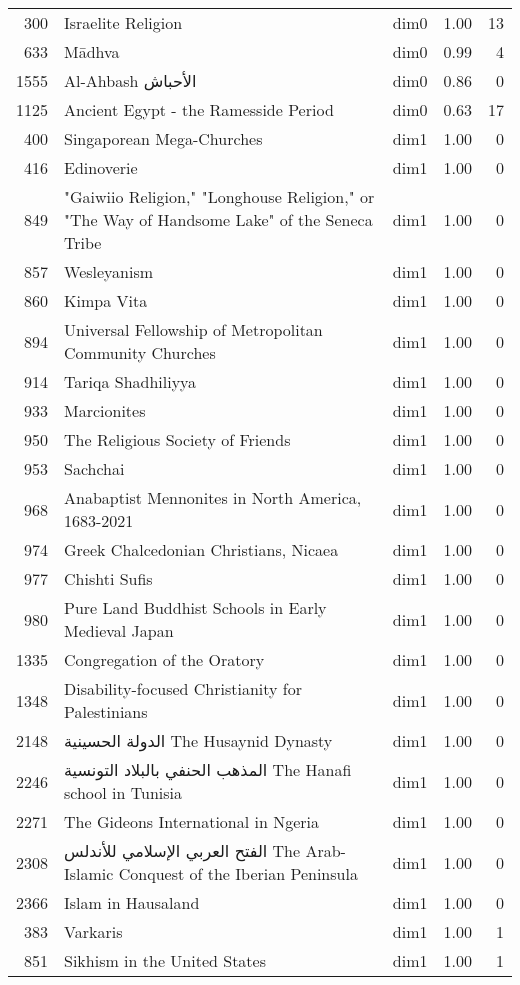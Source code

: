 \begin{tabular}{rllrr}
300 & Israelite Religion & dim0 & 1.00 & 13 \\
633 & Mādhva & dim0 & 0.99 & 4 \\
1555 & Al-Ahbash الأحباش & dim0 & 0.86 & 0 \\
1125 & Ancient Egypt - the Ramesside Period & dim0 & 0.63 & 17 \\
400 & Singaporean Mega-Churches & dim1 & 1.00 & 0 \\
416 & Edinoverie & dim1 & 1.00 & 0 \\
849 & "Gaiwiio Religion," "Longhouse Religion," or "The Way of Handsome Lake" of the Seneca Tribe & dim1 & 1.00 & 0 \\
857 & Wesleyanism & dim1 & 1.00 & 0 \\
860 & Kimpa Vita & dim1 & 1.00 & 0 \\
894 & Universal Fellowship of Metropolitan Community Churches & dim1 & 1.00 & 0 \\
914 & Tariqa Shadhiliyya & dim1 & 1.00 & 0 \\
933 & Marcionites & dim1 & 1.00 & 0 \\
950 & The Religious Society of Friends & dim1 & 1.00 & 0 \\
953 & Sachchai & dim1 & 1.00 & 0 \\
968 & Anabaptist Mennonites in North America, 1683-2021 & dim1 & 1.00 & 0 \\
974 & Greek Chalcedonian Christians, Nicaea & dim1 & 1.00 & 0 \\
977 & Chishti Sufis & dim1 & 1.00 & 0 \\
980 & Pure Land Buddhist Schools in Early Medieval Japan & dim1 & 1.00 & 0 \\
1335 & Congregation of the Oratory & dim1 & 1.00 & 0 \\
1348 & Disability-focused Christianity for Palestinians & dim1 & 1.00 & 0 \\
2148 & الدولة الحسينية The Husaynid Dynasty & dim1 & 1.00 & 0 \\
2246 & المذهب الحنفي بالبلاد التونسية The Hanafi school in Tunisia & dim1 & 1.00 & 0 \\
2271 & The Gideons International in Ngeria & dim1 & 1.00 & 0 \\
2308 & الفتح العربي الإسلامي للأندلس The Arab-Islamic Conquest of the Iberian Peninsula & dim1 & 1.00 & 0 \\
2366 & Islam in Hausaland & dim1 & 1.00 & 0 \\
383 & Varkaris & dim1 & 1.00 & 1 \\
851 & Sikhism in the United States & dim1 & 1.00 & 1 \\

\end{tabular}
